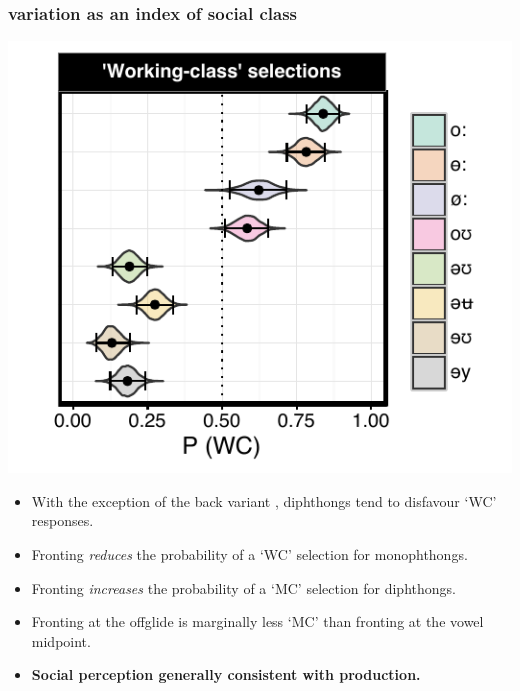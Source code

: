 \documentclass[a0,portrait]{a0poster}
\begin{document}
\begin{multicols*}{3}
\subsubsection*{ variation as an index of social class}
\begin{minipage}{0.22\textwidth}
\hspace*{-1cm}
\includegraphics[scale=2.2]{ow_class_effects.pdf}
\end{minipage}
\hspace*{-.5cm}
\begin{minipage}{0.11\textwidth}
\raggedright
\begin{itemize}
\item{With the exception of the back variant \textipa{[oU]}, diphthongs tend to disfavour `WC' responses.}
\item{Fronting \textit{reduces} the probability of a `WC' selection for monophthongs.}
\item{Fronting \textit{increases} the probability of a `MC' selection for diphthongs.}
\end{itemize}
\end{minipage}
\begin{itemize}
\item{Fronting at the offglide is marginally less `MC' than fronting at the vowel midpoint.}
\item{\textbf{Social perception generally consistent with production.}}
\end{itemize}


\end{multicols*}
\end{document}
